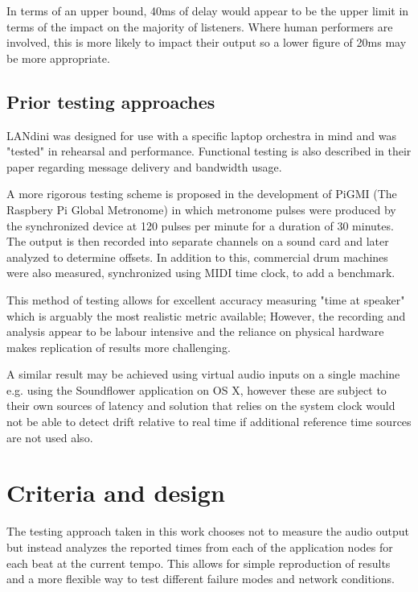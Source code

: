 \documentclass[11pt]{article} %
\theoremstyle{plain}
\theoremstyle{definition}
\begin{document}
In terms of an upper bound, 40ms of delay would appear to be the upper limit in
terms of the impact on the majority of listeners. Where human performers are involved,
this is more likely to impact their output so a lower figure of 20ms may be
more appropriate.

\subsection{Prior testing approaches}

LANdini\cite{narveson2013landini} was designed for use with a specific laptop
orchestra in mind and was "tested" in rehearsal and performance. Functional
testing is also described in their paper regarding message delivery and
bandwidth usage.

A more rigorous testing scheme is proposed in the development of
PiGMI\cite{Oda2016} (The Raspbery Pi Global Metronome) in which metronome
pulses were produced by the synchronized device at 120 pulses per minute for a
duration of 30 minutes. The output is then recorded into separate channels on a
sound card and later analyzed to determine offsets. In addition to this,
commercial drum machines were also measured, synchronized using MIDI time
clock, to add a benchmark.

This method of testing allows for excellent accuracy measuring "time at
speaker" which is arguably the most realistic metric available; However, the
recording and analysis appear to be labour intensive and the reliance on
physical hardware makes replication of results more challenging.

A similar result may be achieved using virtual audio inputs on a single machine
e.g. using the Soundflower application on OS X, however these are subject to
their own sources of latency and solution that relies on the system clock would
not be able to detect drift relative to real time if additional reference time
sources are not used also.

\section{Criteria and design}

The testing approach taken in this work chooses not to measure the audio output
but instead analyzes the reported times from each of the application nodes for
each beat at the current tempo.  This allows for simple reproduction of results
and a more flexible way to test different failure modes and network conditions.
\end{document}
